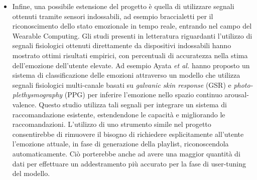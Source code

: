 \documentclass[11pt]{report}
\begin{document}
\begin{itemize}


\item Infine, una possibile estensione del progetto è quella di utilizzare segnali ottenuti tramite sensori indossabili, ad esempio braccialetti per il riconoscimento dello stato emozionale in tempo reale, entrando nel campo del Wearable Computing. Gli studi presenti in letteratura riguardanti l'utilizzo di segnali fisiologici ottenuti direttamente da dispositivi indossabili hanno mostrato ottimi risultati empirici, con percentuali di accuratezza nella stima dell'emozione dell'utente elevate. Ad esempio Ayata \textit{et al.} \cite{wearable} hanno proposto un sistema di classificazione delle emozioni attraverso un modello che utilizza segnali fisiologici multi-canale basati su \textit{galvanic skin response} (GSR) e \textit{photo-plethysmography} (PPG) per inferire l'emozione nello spazio continuo arousal-valence. Questo studio utilizza tali segnali per integrare un sistema di raccomandazione esistente, estendendone le capacità e migliorando le raccomandazioni. L'utilizzo di uno strumento simile nel progetto consentirebbe di rimuovere il bisogno di richiedere esplicitamente all'utente l'emozione attuale, in fase di generazione della playlist, riconoscendola automaticamente. Ciò porterebbe anche ad avere una maggior quantità di dati per effettuare un addestramento più accurato per la fase di user-tuning del modello.

\end{itemize}



\newpage

\appendix
\end{document}
